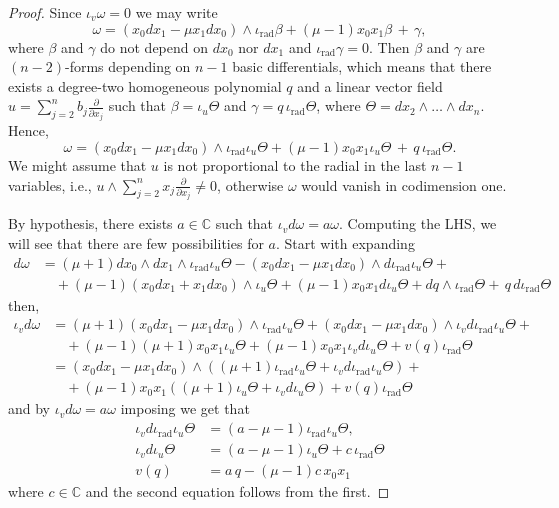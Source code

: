 \documentclass[twoside]{amsart}
\numberwithin{equation}{section}
\DeclareMathOperator{\rad}{rad}
\def\CC{{\mathbb{C}}}
\newcommand{\del}[1]{\frac{\partial}{\partial #1}}
\theoremstyle{definition}
\begin{document}
\begin{proof}
 Since $\iota_v\omega = 0$ we may write  
 \[
 \omega = (x_0 dx_1 - \mu x_1 dx_0) \wedge \iota_{\rad}\beta + (\mu-1)x_0x_1\beta \, + \, \gamma,
 \]
 where $\beta$ and $\gamma$ do not depend on $dx_0$ nor $dx_1$ and $\iota_{\rad}\gamma = 0$. Then $\beta$ and $\gamma$ are $(n-2)$-forms depending on $n-1$ basic differentials, which means that there exists a degree-two homogeneous polynomial $q$ and a linear vector field $u = \sum_{j=2}^n b_j \del{ x_j}$ such that $\beta = \iota_u \Theta$ and $\gamma = q \, \iota_{\rad}\Theta$, where $\Theta = dx_2 \wedge \dots \wedge dx_n$. Hence,
 \[
 \omega = (x_0 dx_1 - \mu x_1 dx_0) \wedge \iota_{\rad}\iota_{u} \Theta + (\mu-1)x_0x_1\iota_u \Theta \, + \,q \, \iota_{\rad}\Theta.
 \]
 We might assume that $u$ is not proportional to the radial in the last $n-1$ variables, i.e., $u\wedge \sum_{j=2}^n x_j \del{ x_j} \neq 0$, otherwise $\omega$ would vanish in codimension one. 
 
 By hypothesis, there exists $a\in \CC$ such that $\iota_v d\omega = a \omega$. Computing the LHS, we will see that there are few possibilities for $a$. Start with expanding 
 \begin{align*}
 d\omega & = (\mu+1)dx_0 \wedge dx_1 \wedge \iota_{\rad}\iota_u \Theta - (x_0 dx_1 - \mu x_1 dx_0) \wedge d\iota_{\rad}\iota_u \Theta +\\ & \quad + (\mu-1)(x_0dx_1+x_1dx_0)\wedge \iota_u \Theta + (\mu-1)x_0x_1d\iota_u \Theta + dq\wedge \iota_{\rad}\Theta + \, q \, d\iota_{\rad}\Theta 
 \end{align*}
 then, 
 \begin{align*}
 \iota_vd\omega & = (\mu+1)(x_0 dx_1 - \mu x_1 dx_0)\wedge \iota_{\rad}\iota_u \Theta + (x_0 dx_1 - \mu x_1 dx_0) \wedge \iota_v d\iota_{\rad}\iota_u \Theta + \\ & \quad + (\mu-1)(\mu+1)x_0x_1\iota_u \Theta +(\mu-1)x_0x_1 \iota_v d\iota_u \Theta + v(q)\iota_{\rad}\Theta \\
 & = (x_0 dx_1 - \mu x_1 dx_0)\wedge ((\mu+1)\iota_{\rad}\iota_u \Theta + \iota_v d\iota_{\rad}\iota_u \Theta)+ \\ & \quad + (\mu-1)x_0x_1( (\mu+1)\iota_u \Theta + \iota_v d\iota_u \Theta) + v(q)\iota_{\rad}\Theta 
 \end{align*}
 and by $\iota_v d\omega = a \omega$ imposing we get that 
 \begin{align*}
 \iota_v d\iota_{\rad} \iota_u \Theta &= (a-\mu-1)\iota_{\rad} \iota_u \Theta, \\
 \iota_v d\iota_u \Theta &= (a-\mu-1) \iota_u \Theta + c\, \iota_{\rad} \Theta \\
 v(q) &= a \, q -(\mu-1)c \, x_0x_1
 \end{align*}
 where $c\in \CC$ and the second equation follows from the first. 
 

\end{proof}
\end{document}
